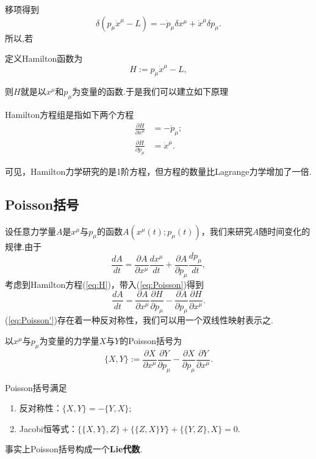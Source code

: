 		移项得到
		\begin{equation}\label{eq:delta H}
		\delta(p_\mu{\dot{x}}^\mu-L)=-{\dot{p}}_\mu\delta x^\mu+{\dot{x}}^\mu\delta p_\mu.
		\end{equation}
		所以,若
		\begin{definition}
		定义Hamilton函数为
		\begin{equation}
			H:=p_\mu{\dot{x}}^\mu-L,
		\end{equation}
		\end{definition}
		则$H$就是以$x^\mu$和$p_\mu$为变量的函数.于是我们可以建立如下原理
		\begin{theorem}
		Hamilton方程组是指如下两个方程
		\begin{equation}
			\begin{split}\label{eq:H}
				\frac{\partial H}{\partial x^\mu}&=-{\dot{p}}_\mu;\\
				\frac{\partial H}{\partial p_\mu}&={\dot{x}}^\mu.
			\end{split}
		\end{equation}
		\end{theorem}
		可见，Hamilton力学研究的是1阶方程，但方程的数量比Lagrange力学增加了一倍.
	
	\subsection{Poisson括号}
		设任意力学量$A$是$x^\mu$与$p_\mu$的函数$A(x^\mu(t);p_\mu(t))$，我们来研究$A$随时间变化的规律.由于
		\begin{equation}\label{eq:Poisson}
		\frac{dA}{dt}=\frac{\partial A}{\partial x^\mu}\frac{d x^\mu}{dt}+\frac{\partial A}{\partial p_\mu}\frac{dp_\mu}{dt},
		\end{equation}
		考虑到Hamilton方程(\ref{eq:H})，带入(\ref{eq:Poisson})得到
		\begin{equation}\label{eq:Poisson'}
		\frac{dA}{dt}=\frac{\partial A}{\partial x^\mu}\frac{\partial H}{\partial p_\mu}-\frac{\partial A}{\partial p_\mu}\frac{\partial H}{\partial x^\mu}.
		\end{equation}
		(\ref{eq:Poisson'})存在着一种反对称性，我们可以用一个双线性映射表示之.
		\begin{definition}
		以$x^\mu$与$p_\mu$为变量的力学量$X$与$Y$的Poisson括号为
		\begin{equation}\label{eq:PB}
			\{X,Y\}:=\frac{\partial X}{\partial x^\mu}\frac{\partial Y}{\partial p_\mu}-\frac{\partial X}{\partial p_\mu}\frac{\partial Y}{\partial x^\mu}.
		\end{equation}
		\end{definition}
		\begin{remark}
			Poisson括号满足
			\begin{enumerate}
				\item 反对称性：$\{X,Y\}=-\{Y,X\}$;
				\item Jacobi恒等式：$\{\{X,Y\},Z\}+\{\{Z,X\}Y\}+\{\{Y,Z\},X\}=0$.
			\end{enumerate}
			事实上Poisson括号构成一个\textbf{Lie代数}.
		\end{remark}
		
